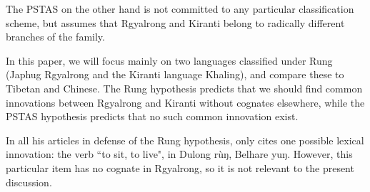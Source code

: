 \documentclass[oldfontcommands,oneside,a4paper,11pt]{article}
\newcommand{\ipa}[1]{{\phon #1}} %
\begin{document}
The PSTAS on the other hand is not committed to any particular classification scheme, but assumes that Rgyalrong and Kiranti belong to radically different branches of the family.

In this paper, we will focus mainly on two languages classified under Rung (Japhug Rgyalrong and the Kiranti language Khaling), and compare these to Tibetan and Chinese. The Rung hypothesis predicts that we should find common innovations between Rgyalrong and Kiranti without cognates elsewhere, while the PSTAS hypothesis predicts that no such common innovation exist.

In all his articles in defense of the Rung hypothesis, \citet{lapolla14subgrouping} only cites one possible lexical innovation: the verb ``to sit, to live", in Dulong \ipa{rùŋ}, Belhare \ipa{yuŋ}. However, this particular item has no cognate in Rgyalrong, so it is not relevant to the present discussion.
\end{document}
